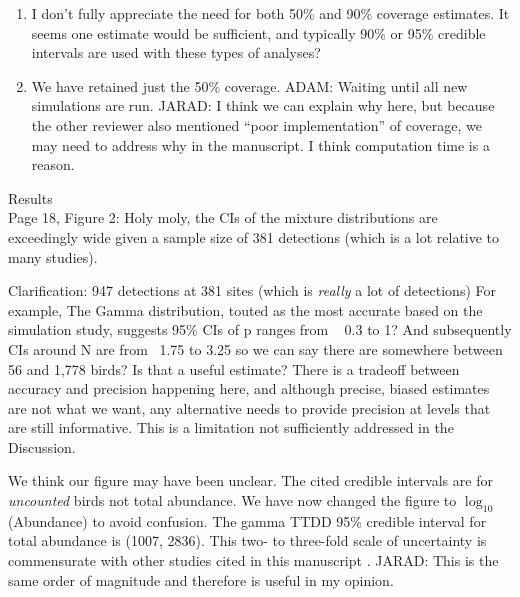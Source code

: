 \documentclass[12pt]{article}
\renewenvironment{quote}  %
              {\list{}{\rightmargin\leftmargin}\normalfont%
               \item\relax}
              {\endlist}
\newcommand{\adam}[1]{{\color{blue} ADAM: #1}}
\newcommand{\jarad}[1]{{\color{Orange} JARAD: #1}}
\begin{document}
\begin{enumerate}
\item I don’t fully appreciate the need for both 50\% and 90\% coverage estimates.  It seems one estimate would be sufficient, and typically 90\% or 95\% credible intervals are used with these types of analyses?
\begin{quote}
We have retained just the 50\% coverage.
\adam{Waiting until all new simulations are run.}
\jarad{I think we can explain why here, but because the other reviewer also 
mentioned ``poor implementation'' of coverage, we may need to address why in the manuscript.
I think computation time is a reason.}
\end{quote}
\end{enumerate}

Results\\
Page 18, Figure 2:  Holy moly, the CIs of the mixture distributions are exceedingly wide given a sample size of 381 detections (which is a lot relative to many studies).
\begin{quote} Clarification: 947 detections at 381 sites (which is \textit{really} a lot of detections)\end{quote}
For example, The Gamma distribution, touted as the most accurate based on the simulation study, suggests 95\% CIs of p ranges from ~ 0.3 to 1?  And subsequently CIs around N are from ~1.75 to 3.25 so we can say there are somewhere between 56 and 1,778  birds?
Is that a useful estimate?  There is a tradeoff between accuracy and precision happening here, and although precise, biased estimates are not what we want, any alternative needs to provide precision at levels that are still informative.  This is a limitation not sufficiently addressed in the Discussion.
\begin{quote} 
We think our figure may have been unclear.
The cited credible intervals are for \textit{uncounted} birds not total abundance.
We have now changed the figure to $\log_{10}$(Abundance) to avoid confusion.
The gamma TTDD 95\% credible interval for total abundance is (1007, 2836).
This two- to three-fold scale of uncertainty is commensurate with other studies cited in this manuscript \citep{Diefenbach2007, Reidy2011, Solymos2013, Amundson2014}.
\jarad{This is the same order of magnitude and therefore is useful in my opinion.}
\end{quote}
\end{document}

